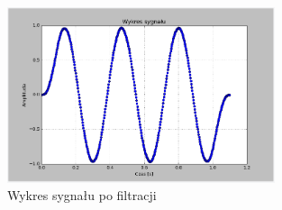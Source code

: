 \documentclass{article}
\begin{document}
{{            \begin{figure}[h!]
                \centering
                \includegraphics[width=0.7\textwidth]{img/fil10.png}
                \caption{Wykres sygnału po filtracji}
            \end{figure}
            \FloatBarrier
        }
        \newpage

}
\end{document}
